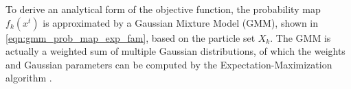 \documentclass[twocolumn,10pt]{asme2e}
\begin{document}
\fi
To derive an analytical form of the objective function, the probability map $f_k(x^t)$ is approximated by a Gaussian Mixture Model (GMM), shown in \cref{eqn:gmm_prob_map_exp_fam}, based on the particle set $X_k$. 
The GMM is actually a weighted sum of multiple Gaussian distributions, of which the weights and Gaussian parameters can be computed by the Expectation-Maximization algorithm \cite{bilmes1998gentle}.
\end{document}
